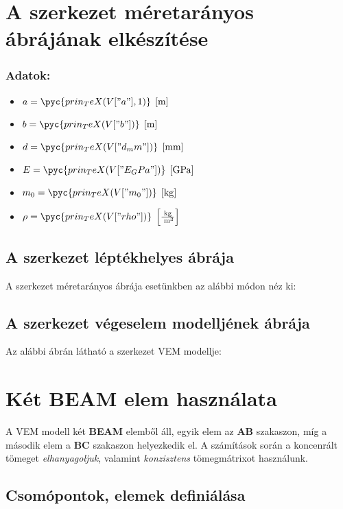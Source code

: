 \documentclass[12pt,a4paper]{article}
\def\m{\; \left[\mathrm{m}\right]}
\def\mili{\; \left[\mathrm{mm}\right]}
\def\Gpa{\; \left[\mathrm{GPa}\right]}
\def\kg{\; \left[\mathrm{kg}\right]}
\def\kgpm{\; \left[\mathrm{\frac{kg}{\; m^3}}\right]}
\begin{document}
\section{A szerkezet méretarányos ábrájának elkészítése}
\subsubsection*{Adatok:}

\begin{multicols}{2}
    \begin{itemize}
        \item $a=\pyc{prin_TeX(V["a"],1)}\m$
        \item $b=\pyc{prin_TeX(V["b"])}\m$
        \item $d=\pyc{prin_TeX(V["d_mm"])}\mili$
    \end{itemize}
    \columnbreak
    \begin{itemize}
        \item $E=\pyc{prin_TeX(V["E_GPa"])} \Gpa$
        \item $m_0=\pyc{prin_TeX(V["m_0"])} \kg$
        \item $\rho=\pyc{prin_TeX(V["rho"])} \kgpm $
    \end{itemize}
\end{multicols}

\subsection{A szerkezet léptékhelyes ábrája}
A szerkezet méretarányos ábrája esetünkben az alábbi módon néz ki:

\subsection{A szerkezet végeselem modelljének ábrája}
Az alábbi ábrán látható a szerkezet VEM modellje:

\section{Két BEAM elem használata}
A VEM modell két \textbf{BEAM} elemből áll, egyik elem az \textbf{AB} szakaszon,
míg a második elem a \textbf{BC} szakaszon helyezkedik el. A számítások során
a koncenrált tömeget \textit{elhanyagoljuk}, valamint \textit{konzisztens} tömegmátrixot
használunk.
\subsection{Csomópontok, elemek definiálása}
\end{document}
